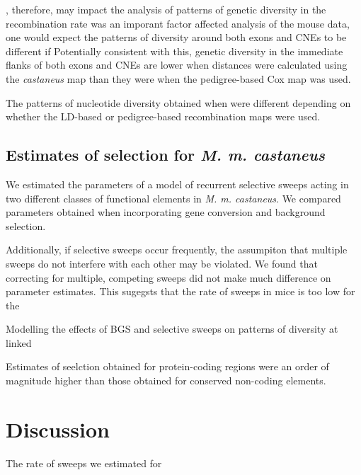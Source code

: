 \documentclass[11pt]{article}
\begin{document}
	
		, therefore, may impact the analysis of patterns of genetic diversity in the recombination rate was an imporant factor  affected analysis of the mouse data, one would expect the patterns of diversity around both exons and CNEs to be different if 
	Potentially consistent with this, genetic diversity in the immediate flanks of both exons and CNEs are lower when distances were calculated using the \textit{castaneus} map than they were when the pedigree-based Cox map was used.
	
		The patterns of nucleotide diversity obtained when were different depending on whether the LD-based or pedigree-based recombination maps were used. 
	
\subsection*{Estimates of selection for \textit{M. m. castaneus}}

	We estimated the parameters of a model of recurrent selective sweeps acting in two different classes of functional elements in \textit{M. m. castaneus}. We compared parameters obtained when incorporating gene conversion and background selection.
	
	Additionally, if selective sweeps occur frequently, the assumpiton that multiple sweeps do not interfere with each other may be violated. We found that correcting for multiple, competing sweeps did not make much difference on parameter estimates. This sugegsts that the rate of sweeps in mice is too low for the 

Modelling the effects of BGS and selective sweeps on patterns of diversity at linked 


Estimates of seelction obtained for protein-coding regions were an order of magnitude higher than those obtained for conserved non-coding elements. 





\section*{Discussion}

The rate of sweeps we estimated for 
\end{document}

